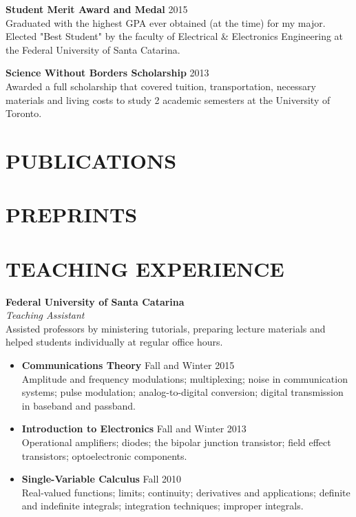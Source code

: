 \documentclass[margin, line]{res}
\begin{document}
\begin{resume}
\textbf{Student Merit Award and Medal} \hfill 2015\\
Graduated with the highest GPA ever obtained (at the time) for my major. Elected "Best Student" by the faculty of Electrical \& Electronics Engineering at the Federal University of Santa Catarina.

\textbf{Science Without Borders Scholarship} \hfill 2013\\
Awarded a full scholarship that covered tuition, transportation, necessary materials and living costs to study 2 academic semesters at the University of Toronto.

\section{PUBLICATIONS}
\nocite{*}
\printbibliography[heading=none, keyword=publication]

\section{PREPRINTS}
\printbibliography[heading=none, keyword=preprint]

\newpage
\section{TEACHING EXPERIENCE}
\textbf{Federal University of Santa Catarina}\\
{\sl Teaching Assistant}\\
Assisted professors by ministering tutorials, preparing lecture materials and helped students individually at regular office hours.

\begin{itemize}
    \item \textbf{Communications Theory} \hfill Fall and Winter 2015\\
Amplitude and frequency modulations; multiplexing; noise in communication systems; pulse modulation; analog-to-digital conversion; digital transmission in baseband and passband.
    \item \textbf{Introduction to Electronics} \hfill Fall and Winter 2013\\
Operational amplifiers; diodes; the bipolar junction transistor; field effect transistors; optoelectronic components.
    \item \textbf{Single-Variable Calculus} \hfill Fall 2010\\
Real-valued functions; limits; continuity; derivatives and applications; definite and indefinite integrals; integration techniques; improper integrals.
\end{itemize}


\end{resume}
\end{document}
